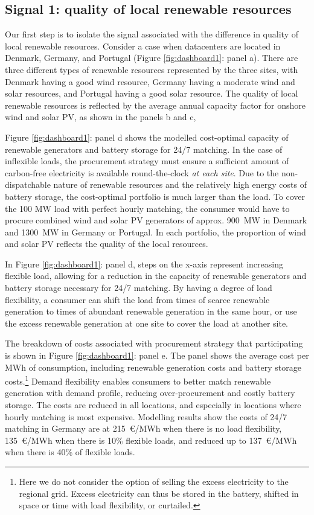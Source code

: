 %

\subsection{Signal 1: quality of local renewable resources}

Our first step is to isolate the signal associated with the difference in quality of local renewable resources. Consider a case when datacenters are located in Denmark, Germany, and Portugal (Figure \ref{fig:dashboard1}: panel a). There are three different types of renewable resources represented by the three sites, with Denmark having a good wind resource, Germany having a moderate wind and solar resources, and Portugal having a good solar resource. The quality of local renewable resources is reflected by the average annual capacity factor for onshore wind and solar PV, as shown in the panels b and c,

Figure \ref{fig:dashboard1}: panel d shows the modelled cost-optimal capacity of renewable generators and battery storage for 24/7 matching. In the case of inflexible loads, the procurement strategy must ensure a sufficient amount of carbon-free electricity is available round-the-clock \textit{at each site}. Due to the non-dispatchable nature of renewable resources and the relatively high energy costs of battery storage, the cost-optimal portfolio is much larger than the load. To cover the 100 MW load with perfect hourly matching, the consumer would have to procure combined wind and solar PV generators of approx. 900~MW in Denmark and 1300~MW in Germany or Portugal. In each portfolio, the proportion of wind and solar PV reflects the quality of the local resources. 

In Figure \ref{fig:dashboard1}: panel d, steps on the x-axis represent increasing flexible load, allowing for a reduction in the capacity of renewable generators and battery storage necessary for 24/7 matching. By having a degree of load flexibility, a consumer can shift the load from times of scarce renewable generation to times of abundant renewable generation in the same hour, or use the excess renewable generation at one site to cover the load at another site.

The breakdown of costs associated with procurement strategy that participating is shown in Figure \ref{fig:dashboard1}: panel e. The panel shows the average cost per MWh of consumption, including renewable generation costs and battery storage costs.\footnote{Here we do not consider the option of selling the excess electricity to the regional grid. Excess electricity can thus be stored in the battery, shifted in space or time with load flexibility, or curtailed.} Demand flexibility enables consumers to better match renewable generation with demand profile, reducing over-procurement and costly battery storage. The costs are reduced in all locations, and especially in locations where hourly matching is most expensive. Modelling results show the costs of 24/7 matching in Germany are at 215~\euro/MWh when there is no load flexibility, 135~\euro/MWh when there is 10\% flexible loads, and reduced up to 137~\euro/MWh when there is 40\% of flexible loads.

